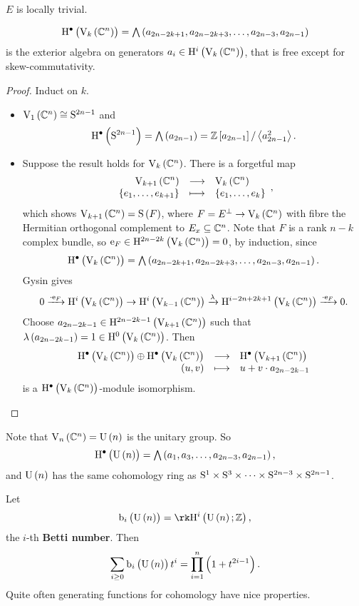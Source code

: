 \begin{exercise*}
$ E $ is locally trivial.
\end{exercise*}

\begin{proposition}
$$ \H^\bullet\br{\V_k\br{\CC^n}} = \ext\br{a_{2n - 2k + 1}, a_{2n - 2k + 3}, \dots, a_{2n - 3}, a_{2n - 1}} $$
is the exterior algebra on generators $ a_i \in \H^i\br{\V_k\br{\CC^n}} $, that is free except for skew-commutativity.
\end{proposition}

\begin{proof}
Induct on $ k $.
\begin{itemize}
\item $ \V_1\br{\CC^n} \cong \S^{2n - 1} $ and
$$ \H^\bullet\br{\S^{2n - 1}} = \ext\br{a_{2n - 1}} = \ZZ\sbr{a_{2n - 1}} / \abr{a_{2n - 1}^2}. $$
\item Suppose the result holds for $ \V_k\br{\CC^n} $. There is a forgetful map
$$ \function{\V_{k + 1}\br{\CC^n}}{\V_k\br{\CC^n}}{\cbr{e_1, \dots, e_{k + 1}}}{\cbr{e_1, \dots, e_k}}, $$
which shows $ \V_{k + 1}\br{\CC^n} = \S\br{F} $, where $ F = E^\perp \to \V_k\br{\CC^n} $ with fibre the Hermitian orthogonal complement to $ E_x \subseteq \CC^n $. Note that $ F $ is a rank $ n - k $ complex bundle, so $ \e_F \in \H^{2n - 2k}\br{\V_k\br{\CC^n}} = 0 $, by induction, since
$$ \H^\bullet\br{\V_k\br{\CC^n}} = \ext\br{a_{2n - 2k + 1}, a_{2n - 2k + 3}, \dots, a_{2n - 3}, a_{2n - 1}}. $$
Gysin gives
$$ 0 \xrightarrow{\cdot \e_F} \H^i\br{\V_k\br{\CC^n}} \to \H^i\br{\V_{k - 1}\br{\CC^n}} \xrightarrow{\lambda} \H^{i - 2n + 2k + 1}\br{\V_k\br{\CC^n}} \xrightarrow{\cdot \e_F} 0. $$
Choose $ a_{2n - 2k - 1} \in \H^{2n - 2k - 1}\br{\V_{k + 1}\br{\CC^n}} $ such that $ \lambda\br{a_{2n - 2k - 1}} = 1 \in \H^0\br{\V_k\br{\CC^n}} $. Then
$$ \function{\H^\bullet\br{\V_k\br{\CC^n}} \oplus \H^\bullet\br{\V_k\br{\CC^n}}}{\H^\bullet\br{\V_{k + 1}\br{\CC^n}}}{\br{u, v}}{u + v \cdot a_{2n - 2k - 1}} $$
is a $ \H^\bullet\br{\V_k\br{\CC^n}} $-module isomorphism.
\end{itemize}
\end{proof}

Note that $ \V_n\br{\CC^n} = \U\br{n} $ is the unitary group. So
$$ \H^\bullet\br{\U\br{n}} = \ext\br{a_1, a_3, \dots, a_{2n - 3}, a_{2n - 1}}, $$
and $ \U\br{n} $ has the same cohomology ring as $ \S^1 \times \S^3 \times \dots \times \S^{2n - 3} \times \S^{2n - 1} $.

\begin{remark*}
Let
$$ \b_i\br{\U\br{n}} = \rk \H^i\br{\U\br{n}; \ZZ}, $$
the $ i $-th \textbf{Betti number}. Then
$$ \sum_{i \ge 0} \b_i\br{\U\br{n}}t^i = \prod_{i = 1}^n \br{1 + t^{2i - 1}}. $$
Quite often generating functions for cohomology have nice properties.
\end{remark*}

